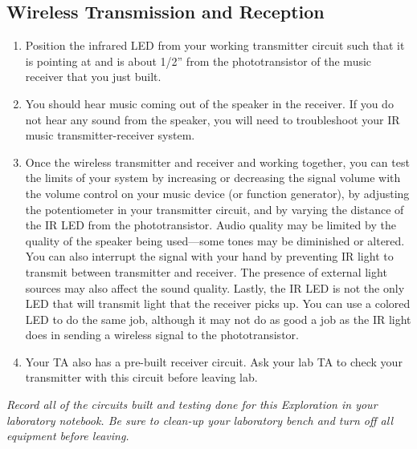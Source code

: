 \documentclass[12pt]{../manual}
\begin{document}
\subsection{Wireless Transmission and Reception}
\begin{enumerate}
\item Position the infrared LED from your working transmitter circuit such that it is pointing at and is about 1/2'' from the phototransistor of the music receiver that you just built.
\item You should hear music coming out of the speaker in the receiver. If you do not hear any sound from the speaker, you will need to troubleshoot your IR music transmitter-receiver system.
\item Once the wireless transmitter and receiver and working together, you can test the limits of your system by increasing or decreasing the signal volume with the volume control on your music device (or function generator), by adjusting the potentiometer in your transmitter circuit, and by varying the distance of the IR LED from the phototransistor. Audio quality may be limited by the quality of the speaker being used---some tones may be diminished or altered. You can also interrupt the signal with your hand by preventing IR light to transmit between transmitter and receiver. The presence of external light sources may also affect the sound quality. Lastly, the IR LED is not the only LED that will transmit light that the receiver picks up. You can use a colored LED to do the same job, although it may not do as good a job as the IR light does in sending a wireless signal to the phototransistor.
\item Your TA also has a pre-built receiver circuit. Ask your lab TA to check your transmitter with this circuit before leaving lab.
\end{enumerate}
{\it Record all of the circuits built and testing done for this Exploration in your laboratory notebook. Be sure to clean-up your laboratory bench and turn off all equipment before leaving.}

\newpage
\end{document}
